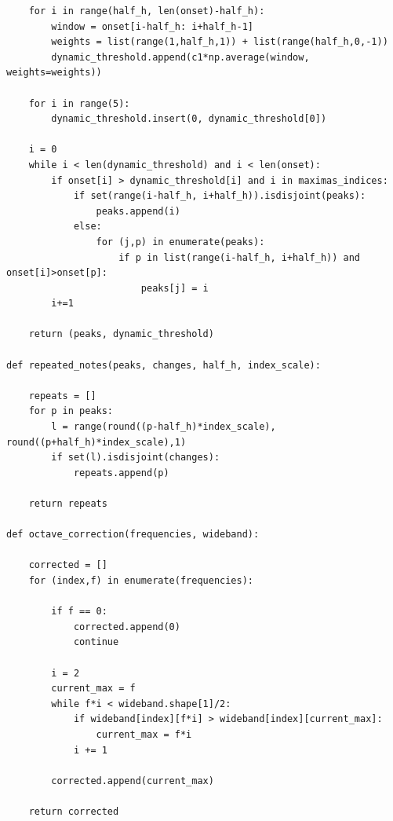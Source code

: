 \documentclass[a4paper,12pt]{report}
\begin{document}
\begin{verbatim}
    for i in range(half_h, len(onset)-half_h):
        window = onset[i-half_h: i+half_h-1]
        weights = list(range(1,half_h,1)) + list(range(half_h,0,-1))
        dynamic_threshold.append(c1*np.average(window, weights=weights))

    for i in range(5):
        dynamic_threshold.insert(0, dynamic_threshold[0])
    
    i = 0
    while i < len(dynamic_threshold) and i < len(onset):
        if onset[i] > dynamic_threshold[i] and i in maximas_indices:
            if set(range(i-half_h, i+half_h)).isdisjoint(peaks):
                peaks.append(i)
            else:
                for (j,p) in enumerate(peaks):
                    if p in list(range(i-half_h, i+half_h)) and onset[i]>onset[p]:
                        peaks[j] = i
        i+=1    

    return (peaks, dynamic_threshold)

def repeated_notes(peaks, changes, half_h, index_scale):

    repeats = []
    for p in peaks:
        l = range(round((p-half_h)*index_scale), round((p+half_h)*index_scale),1)
        if set(l).isdisjoint(changes):
            repeats.append(p)

    return repeats

def octave_correction(frequencies, wideband):

    corrected = []
    for (index,f) in enumerate(frequencies):

        if f == 0:
            corrected.append(0)
            continue

        i = 2
        current_max = f
        while f*i < wideband.shape[1]/2:
            if wideband[index][f*i] > wideband[index][current_max]:
                current_max = f*i
            i += 1

        corrected.append(current_max)

    return corrected
\end{verbatim}
\end{document}
